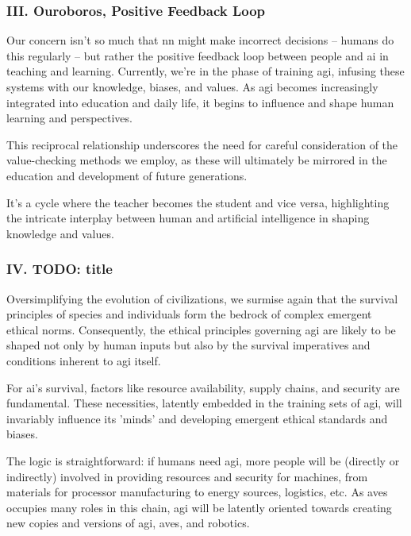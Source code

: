 \documentclass[11pt,a4]{article}
\begin{document}
\subsubsection{III. Ouroboros, Positive Feedback Loop}
    \par
    Our concern isn't so much that \acrshort{nn} might make incorrect decisions --
    humans do this regularly – but rather the positive feedback loop
    between people and \acrshort{ai} in teaching and learning. Currently,
    we're in the phase of training \acrshort{agi}, infusing these
    systems with our knowledge, biases, and values.
    As \acrshort{agi} becomes increasingly integrated into
    education and daily life, it begins to influence and shape
    human learning and perspectives.
    \par
    This reciprocal relationship underscores the need for
    careful consideration of the value-checking methods
    we employ, as these will ultimately be mirrored in
    the education and development of future generations.
    \par
    It's a cycle where the teacher becomes the student and vice versa,
    highlighting the intricate interplay between human and artificial
    intelligence in shaping knowledge and values.


\subsubsection{IV. TODO: title}



    Oversimplifying the evolution of civilizations, we surmise again that the survival principles of species and individuals form the bedrock
    of complex emergent ethical norms. Consequently, the ethical
    principles governing \acrshort{agi} are likely to be shaped
    not only by human inputs but also by the survival
    imperatives and conditions inherent to \acrshort{agi} itself.


    \par
    For \acrshort{ai}'s survival, factors like resource availability, supply chains, and security are fundamental. These necessities, latently embedded in the  training sets of \acrshort{agi}, will invariably influence its 'minds' and developing emergent ethical standards and biases.


    The logic is straightforward: if humans need \acrshort{agi}, more people will be (directly or indirectly) involved in providing resources and security for machines, from materials for processor manufacturing to energy sources, logistics, etc. As \glspl{ave} occupies many roles in this chain, \acrshort{agi} will be latently oriented towards creating new copies and versions of \acrshort{agi}, \glspl{ave}, and robotics.
\end{document}
